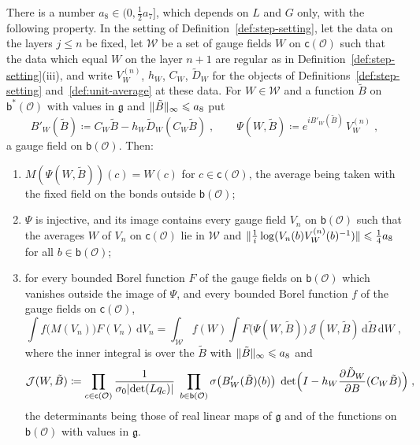 \documentclass[11pt]{preprint}
\newcommand{\dd}{\mathrm{d}}
\DeclarePairedDelimiter{\abs}{\lvert}{\rvert}
\DeclarePairedDelimiter{\norm}{\lVert}{\rVert}
\numberwithin{equation}{section}
\begin{document}
\begin{theorem}\label{thm:fluctuation-coordinates}
There is a number $a_8 \in (0, \frac{1}{2}a_7]$, which depends on $L$ and $G$ only, with the following property. In the setting of Definition~\ref{def:step-setting}, let the data on the layers $j \leqslant n$ be fixed, let $\mathcal W$ be a set of gauge fields $W$ on $\mathsf c(\mathcal O)$ such that the data which equal $W$ on the layer $n + 1$ are regular as in Definition~\ref{def:step-setting}(iii), and write $V^{(n)}_W$, $h_W$, $C_W$, $\tilde D_W$ for the objects of Definitions~\ref{def:step-setting} and~\ref{def:unit-average} at these data. For $W \in \mathcal W$ and a function $\tilde B$ on $\mathsf b^*(\mathcal O)$ with values in $\mathfrak g$ and $\norm{\tilde B}_\infty \leqslant a_8$ put
\begin{equation}\label{eq:fluctuation-coordinates}
    B'_W(\tilde B) \coloneqq C_W\tilde B - h_W\tilde D_W(C_W\tilde B)\;,
    \qquad
    \Psi(W, \tilde B) \coloneqq e^{iB'_W(\tilde B)}\,V^{(n)}_W\;,
\end{equation}
a gauge field on $\mathsf b(\mathcal O)$. Then:
\begin{enumerate}[label=(\roman*)]
\item $M(\Psi(W, \tilde B))(c) = W(c)$ for $c \in \mathsf c(\mathcal O)$, the average being taken with the fixed field on the bonds outside $\mathsf b(\mathcal O)$;
\item $\Psi$ is injective, and its image contains every gauge field $V_n$ on $\mathsf b(\mathcal O)$ such that the averages $W$ of $V_n$ on $\mathsf c(\mathcal O)$ lie in $\mathcal W$ and $\norm{\frac{1}{i}\log(V_n(b)V^{(n)}_W(b)^{-1})} \leqslant \frac{1}{4}a_8$ for all $b \in \mathsf b(\mathcal O)$;
\item for every bounded Borel function $F$ of the gauge fields on $\mathsf b(\mathcal O)$ which vanishes outside the image of $\Psi$, and every bounded Borel function $f$ of the gauge fields on $\mathsf c(\mathcal O)$,
\begin{equation}\label{eq:fluctuation-jacobian}
    \int f\bigl(M(V_n)\bigr)F(V_n)\,\dd V_n = \int_{\mathcal W}f(W)\int F\bigl(\Psi(W, \tilde B)\bigr)\,\mathcal J(W, \tilde B)\,\dd\tilde B\,\dd W\;,
\end{equation}
where the inner integral is over the $\tilde B$ with $\norm{\tilde B}_\infty \leqslant a_8$ and
\begin{equation}\label{eq:jacobian}
    \mathcal J(W, \tilde B) \coloneqq \prod_{c \in \mathsf c(\mathcal O)}\frac{1}{\sigma_0\abs{\det(Lq_c)}}\;\prod_{b \in \mathsf b(\mathcal O)}\sigma\bigl(B'_W(\tilde B)(b)\bigr)\;\det\Bigl(I - h_W\frac{\partial\tilde D_W}{\partial B}(C_W\tilde B)\Bigr)\;,
\end{equation}
the determinants being those of real linear maps of $\mathfrak g$ and of the functions on $\mathsf b(\mathcal O)$ with values in $\mathfrak g$.
\end{enumerate}
\end{theorem}
\end{document}
